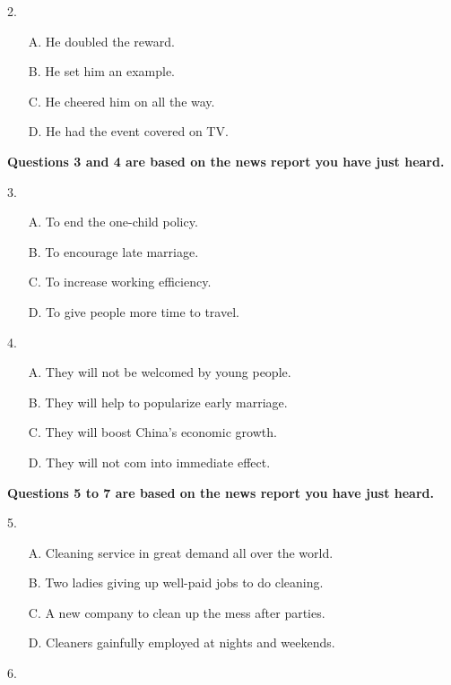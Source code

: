 \documentclass[UTF8,11pt]{ctexart}
\begin{document}
2.


\begin{itemize}[leftmargin=2em,itemsep=.2em,topsep=.4em]\item[A.] He doubled the reward.
\item[B.] He set him an example.
\item[C.] He cheered him on all the way.
\item[D.] He had the event covered on TV.
\end{itemize}

\textbf{Questions 3 and 4 are based on the news report you have just heard.}


3.


\begin{itemize}[leftmargin=2em,itemsep=.2em,topsep=.4em]\item[A.] To end the one-child policy.
\item[B.] To encourage late marriage.
\item[C.] To increase working efficiency.
\item[D.] To give people more time to travel.
\end{itemize}

4.


\begin{itemize}[leftmargin=2em,itemsep=.2em,topsep=.4em]\item[A.] They will not be welcomed by young people.
\item[B.] They will help to popularize early marriage.
\item[C.] They will boost China’s economic growth.
\item[D.] They will not com into immediate effect.
\end{itemize}

\textbf{Questions 5 to 7 are based on the news report you have just heard.}


5.


\begin{itemize}[leftmargin=2em,itemsep=.2em,topsep=.4em]\item[A.] Cleaning service in great demand all over the world.
\item[B.] Two ladies giving up well-paid jobs to do cleaning.
\item[C.] A new company to clean up the mess after parties.
\item[D.] Cleaners gainfully employed at nights and weekends.
\end{itemize}

6.
\end{document}
